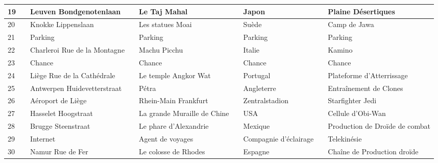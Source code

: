 \documentclass[letterpaper]{article}
\begin{document}
{\begin{tabular}{|l|l|l|l|l|l|l|l|l|}
      19 & \cellcolor[HTML]{FF8C00} & Leuven Bondgenotenlaan & \cellcolor[HTML]{FF8C00} & Le Taj Mahal & \cellcolor[HTML]{FF8C00} & Japon & \cellcolor[HTML]{FF8C00} & Plaine Désertiques \\ \hline
      20 & \cellcolor[HTML]{FF8C00} & Knokke Lippenslaan & \cellcolor[HTML]{FF8C00} & Les statues Moai & \cellcolor[HTML]{FF8C00} & Suède & \cellcolor[HTML]{FF8C00} & Camp de Jawa \\ \hline
      21 & \cellcolor[HTML]{FFFFFF} & Parking & \cellcolor[HTML]{FFFFFF} & Parking & \cellcolor[HTML]{FFFFFF} & Parking & \cellcolor[HTML]{FFFFFF} & Parking \\ \hline
      22 & \cellcolor[HTML]{FF4500} & Charleroi Rue de la Montagne & \cellcolor[HTML]{FF4500} & Machu Picchu & \cellcolor[HTML]{FF4500} & Italie & \cellcolor[HTML]{FF4500} & Kamino \\ \hline
      23 & \cellcolor[HTML]{FFC1C1} & Chance & \cellcolor[HTML]{FFC1C1} & Chance & \cellcolor[HTML]{FFC1C1} & Chance & \cellcolor[HTML]{FFC1C1} & Chance \\ \hline
      24 & \cellcolor[HTML]{FF4500} & Liège Rue de la Cathédrale & \cellcolor[HTML]{FF4500} & Le temple Angkor Wat & \cellcolor[HTML]{FF4500} & Portugal & \cellcolor[HTML]{FF4500} & Plateforme d'Atterrissage \\ \hline
      25 & \cellcolor[HTML]{FF4500} & Antwerpen Huidevetterstraat & \cellcolor[HTML]{FF4500} & Pétra & \cellcolor[HTML]{FF4500} & Angleterre & \cellcolor[HTML]{FF4500} & Entraînement de Clones \\ \hline
      26 & \cellcolor[HTML]{E6E6FA} & Aéroport de Liège & \cellcolor[HTML]{E6E6FA} & Rhein-Main Frankfurt & \cellcolor[HTML]{E6E6FA} & Zentralstadion & \cellcolor[HTML]{E6E6FA} & Starfighter Jedi \\ \hline
      27 & \cellcolor[HTML]{FFD700} & Hasselet Hoogstraat & \cellcolor[HTML]{FFD700} & La grande Muraille de Chine & \cellcolor[HTML]{FFD700} & USA & \cellcolor[HTML]{FFD700} & Cellule d'Obi-Wan \\ \hline
      28 & \cellcolor[HTML]{FFD700} & Brugge Steenstraat & \cellcolor[HTML]{FFD700} & Le phare d'Alexandrie & \cellcolor[HTML]{FFD700} & Mexique & \cellcolor[HTML]{FFD700} & Production de Droïde de combat \\ \hline
      29 & \cellcolor[HTML]{FFFFF0} & Internet & \cellcolor[HTML]{FFFFF0} & Agent de voyages & \cellcolor[HTML]{FFFFF0} & Compagnie d'éclairage & \cellcolor[HTML]{FFFFF0} & Telekinésie \\ \hline
      30 & \cellcolor[HTML]{FFD700} & Namur Rue de Fer & \cellcolor[HTML]{FFD700} & Le colosse de Rhodes & \cellcolor[HTML]{FFD700} & Espagne & \cellcolor[HTML]{FFD700} & Chaîne de Production droïde \\ \hline

\end{tabular}}
\end{document}
